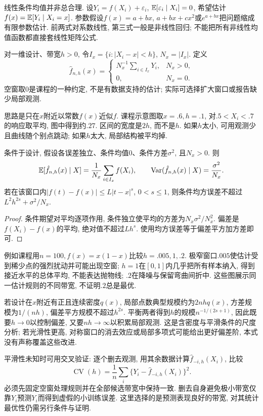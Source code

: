 线性条件均值并非总合理. 设$Y_i=f(X_i)+\varepsilon_i$, $\mathbb E[\varepsilon_i\mid X_i]=0$, 希望估计$f(x)=\mathbb E[Y_i\mid X_i=x]$. 参数假设$f(x)=a+bx$, $a+bx+cx^2$或$e^{a+bx}$把问题缩成有限参数估计. 前两式对系数线性, 第三式一般是非线性回归; 不能把所有非线性均值函数都直接套线性矩阵公式.

\begin{definition}[局部常数估计]
对一维设计、带宽$h>0$, 令$I_x=\{i:|X_i-x|<h\}$, $N_x=|I_x|$. 定义
\[
 \hat f_{n,h}(x)=
 \begin{cases}N_x^{-1}\sum_{i\in I_x}Y_i,&N_x>0,\\0,&N_x=0.\end{cases}
\]
空窗取0是课程的一种约定, 不是有数据支持的估计; 实际可选择扩大窗口或报告缺少局部观测.
\end{definition}
思路是只在$x$附近以常数$f(x)$近似$f$. 课程示意图取$x=.6,h=.1$, 对$.5<X_i<.7$的响应取平均, 图中得到约$.27$. 区间的宽度是$2h$, 而不是$h$. 如果$h$太小, 可用观测少且曲线随个别点跳动; 如果$h$太大, 局部结构被平均掉.

\begin{proposition}[条件偏差与方差]
条件于设计, 假设各误差独立、条件均值0、条件方差$\sigma^2$, 且$N_x>0$. 则
\[
 \mathbb E[\hat f_{n,h}(x)\mid X]=\frac1{N_x}\sum_{i\in I_x}f(X_i),\qquad
 \operatorname{Var}(\hat f_{n,h}(x)\mid X)=\frac{\sigma^2}{N_x}.
\]
若在该窗口内$|f(t)-f(x)|\leq L|t-x|^s$, $0<s\leq1$, 则条件均方误差不超过$L^2h^{2s}+\sigma^2/N_x$.
\end{proposition}
\begin{proof}
条件期望对平均逐项作用, 条件独立使平均的方差为$N_x\sigma^2/N_x^2$. 偏差是$f(X_i)-f(x)$的平均, 绝对值不超过$Lh^s$. 使用均方误差等于偏差平方加方差即可.
\end{proof}
例如课程用$n=100,f(x)=x(1-x)$比较$h=.005,1,.2$. 极窄窗口$.005$使估计受到稀少点的强烈扰动并可能出现空窗; $h=1$在$[0,1]$内几乎把所有样本纳入, 得到接近水平的总体平均, 不能表达抛物线; $.2$在降噪与保留弯曲间折中. 这些图展示同一估计规则的不同带宽, 不证明$.2$总是最优.

若设计在$x$附近有正且连续密度$q(x)$, 局部点数典型规模约为$2nhq(x)$, 方差规模为$1/(nh)$, 偏差平方规模不超过$h^{2s}$. 平衡两者得到$h$的规模$n^{-1/(2s+1)}$, 因此既要$h\to0$以控制偏差, 又要$nh\to\infty$以积累局部观测. 这是含密度与平滑条件的尺度分析; 若光滑性更高, 对称窗口的消去效应或局部多项式可能给出更好偏差阶, 本式没有声称覆盖这些改进.

平滑性未知时可用交叉验证: 逐个删去观测, 用其余数据计算$\hat f_{-i,h}(X_i)$, 比较
\[
 \operatorname{CV}(h)=\frac1n\sum_i\{Y_i-\hat f_{-i,h}(X_i)\}^2.
\]
必须先固定空窗处理规则并在全部候选带宽中保持一致. 删去自身避免极小带宽仅靠$Y_i$预测$Y_i$而得到虚假的小训练误差. 这里选择的是预测表现良好的带宽, 对其统计最优性仍需另行条件与证明.
